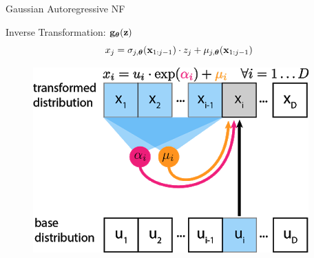 \documentclass{beamer}
\begin{document}
\begin{frame}{Gaussian Autoregressive NF}
	\begin{minipage}[t]{0.65\columnwidth}
		\begin{block}{Inverse Transformation: $\mathbf{g}_{\boldsymbol{\theta}}(\mathbf{z})$}
			\vspace{-0.5cm}
			\[
			x_j = \sigma_{j, \boldsymbol{\theta}} (\mathbf{x}_{1:j-1}) \cdot z_j + \mu_{j, \boldsymbol{\theta}}(\mathbf{x}_{1:j-1})
			\]
		\end{block}
	\end{minipage}%
	\begin{minipage}[t]{0.35\columnwidth}
		\begin{figure}[h]
			\centering
			\includegraphics[width=.9\linewidth]{figs/af_iaf_explained_1.png}
		\end{figure}
	\end{minipage}
\end{frame}
\end{document}
